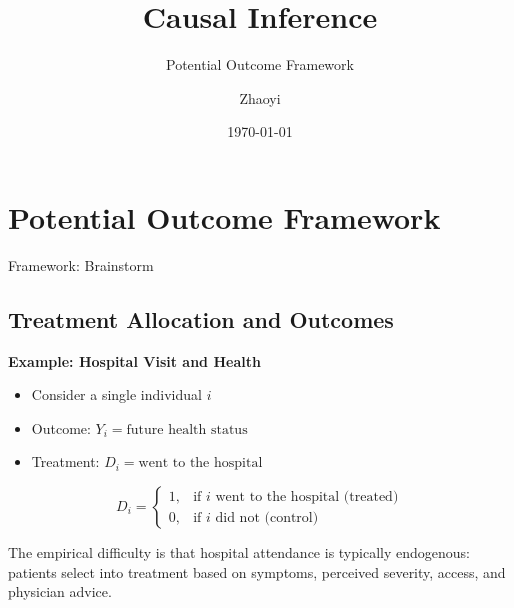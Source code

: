 \documentclass[11pt,aspectratio=169]{beamer}
\title[Causal Inference]{Causal Inference}
\subtitle{Potential Outcome Framework}
\author[Zhaoyi]{Zhaoyi}
\date{\today}
\begin{document}
\begin{titleframe}


\end{titleframe}


\begin{outlineframe}

\end{outlineframe}
\section{Potential Outcome Framework}

\begin{frame}{Framework: Brainstorm}


\end{frame}


\begin{frame}
\subsection*{Treatment Allocation and Outcomes}

\textbf{Example: Hospital Visit and Health}
\begin{itemize}
    \item Consider a single individual $i$
    \item Outcome: $Y_i = \text{future health status}$
    \item Treatment: $D_i = \text{went to the hospital}$
\end{itemize}

$$D_i = \begin{cases} 
1, & \text{if } i \text{ went to the hospital (treated)} \\ 
0, & \text{if } i \text{ did not (control)} 
\end{cases}$$

The empirical difficulty is that hospital attendance is typically endogenous: patients select into treatment based on symptoms, perceived severity, access, and physician advice.
\end{frame}
\end{document}
